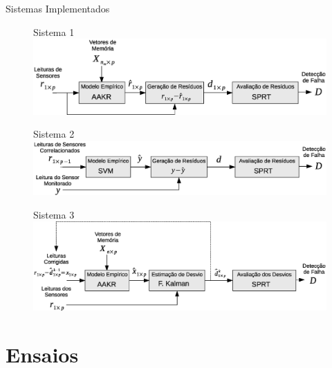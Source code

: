 \documentclass{beamer}
\begin{document}
\begin{frame}{Sistemas Implementados}

    \begin{figure}[!htb]
        \centering Sistema 1
        \includegraphics[width=.8\textwidth]{figuras/aakr_sprt.eps}
    \end{figure}
    
    \begin{figure}[!htb]
        \centering Sistema 2
        \includegraphics[width=.8\textwidth]{figuras/svm_sprt.eps}
    \end{figure}
    
    \begin{figure}[!htb]
        \centering Sistema 3
        \includegraphics[width=.8\textwidth]{figuras/aakr_kf_sprt.eps}
    \end{figure}
    

    \note{
    \begin{itemize}
        \item 
    \end{itemize}}
    
\end{frame}


\section{Ensaios}
\end{document}
